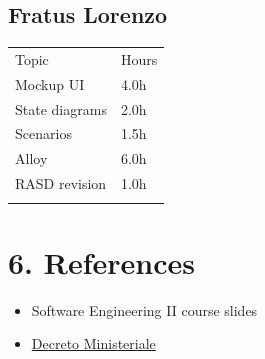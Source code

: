 \clearpage
\section*{Fratus Lorenzo}

\begin{longtable}[]{@{}
  >{\raggedright\arraybackslash}p{}
  >{\raggedleft\arraybackslash}p{}@{}}
\toprule
Topic & Hours \\ \addlinespace
\midrule
\endhead
Mockup UI & 4.0h \\ \addlinespace
State diagrams & 2.0h \\ \addlinespace
Scenarios & 1.5h \\ \addlinespace
Alloy & 6.0h \\ \addlinespace
RASD revision & 1.0h \\ \addlinespace
\bottomrule
\end{longtable}

\chapter{6. References}

\begin{itemize}
\item
  Software Engineering II course slides
\item
  \href{https://www.gazzettaufficiale.it/atto/vediPermalink?atto.dataPubblicazioneGazzetta=2020-11-09\&atto.codiceRedazionale=20G00170\&tipoSerie=serie_generale\&tipoVigenza=originario\&tipoProvvedimento=*}{Decreto Ministeriale}
\end{itemize}


